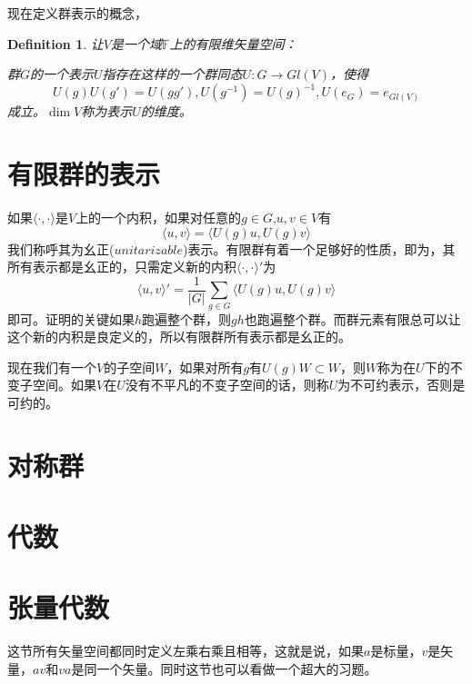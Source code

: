 \documentclass[11pt,a4paper,openany]{book}%
\theoremstyle{plain}%
\newtheorem{defi}{Definition}[chapter]%
\begin{document}
现在定义群表示的概念，
\begin{defi}
让$V$是一个域$\mathbb{F}$上的有限维矢量空间：

群$G$的一个表示$U$指存在这样的一个群同态$U:G\rightarrow Gl(V)$，使得
\[
U(g)U(g')=U(gg'),U(g^{-1})=U(g)^{-1},U(e_G)=e_{Gl(V)}
\]
成立。$\dim V$称为表示$U$的维度。
\end{defi}
\section{有限群的表示}
如果$\langle\cdot,\cdot\rangle$是$V$上的一个内积，如果对任意的$g\in G$,$u,v\in V$有
\[
\langle u,v \rangle=\langle U(g)u,U(g)v \rangle
\]
我们称呼其为幺正($unitarizable$)表示。有限群有着一个足够好的性质，即为，其所有表示都是幺正的，只需定义新的内积$\langle \cdot,\cdot \rangle'$为
\[
\langle u,v \rangle'=\frac{1}{|G|}\sum_{g\in G} \langle U(g)u,U(g)v \rangle
\]
即可。证明的关键如果$h$跑遍整个群，则$gh$也跑遍整个群。而群元素有限总可以让这个新的内积是良定义的，所以有限群所有表示都是幺正的。

现在我们有一个$V$的子空间$W$，如果对所有$g$有$U(g)W\subset W$，则$W$称为在$U$下的不变子空间。如果$V$在$U$没有不平凡的不变子空间的话，则称$U$为不可约表示，否则是可约的。

\section{对称群}

\section{代数}

\section{张量代数}
这节所有矢量空间都同时定义左乘右乘且相等，这就是说，如果$a$是标量，$v$是矢量，$av$和$va$是同一个矢量。同时这节也可以看做一个超大的习题。
\end{document}
